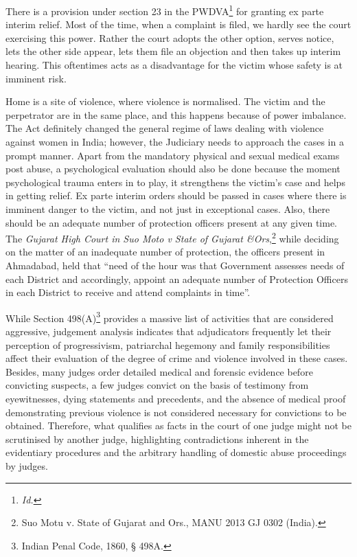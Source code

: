 \begin{multicols}{2}
\noi
There is a provision under section 23 in the PWDVA\footnote{\textit{Id.}} for granting ex parte interim relief.
Most of the time, when a complaint is filed, we hardly see the court exercising this power.
Rather the court adopts the other option, serves notice, lets the other side appear, lets them
file an objection and then takes up interim hearing. This oftentimes acts as a disadvantage for
the victim whose safety is at imminent risk. 

\noi
Home is a site of violence, where violence is normalised. The victim and the perpetrator are
in the same place, and this happens because of power imbalance. The Act definitely changed
the general regime of laws dealing with violence against women in India; however, the
Judiciary needs to approach the cases in a prompt manner. Apart from the mandatory
physical and sexual medical exams post abuse, a psychological evaluation should also be
done because the moment psychological trauma enters in to play, it strengthens the victim’s
case and helps in getting relief. Ex parte interim orders should be passed in cases where there
is imminent danger to the victim, and not just in exceptional cases. Also, there should be an
adequate number of protection officers present at any given time. The \textit{Gujarat High Court in
Suo Moto v State of Gujarat \&Ors},\footnote{Suo Motu v. State of Gujarat and Ors., MANU 2013 GJ 0302 (India).} while deciding on the matter of an inadequate number
of protection, the officers present in Ahmadabad, held that “need of the hour was that Government assesses needs of each District and accordingly, appoint an adequate number of
Protection Officers in each District to receive and attend complaints in time”.


\noi
While Section 498(A)\footnote{Indian Penal Code, 1860, § 498A.} provides a massive list of activities that are considered aggressive,
judgement analysis indicates that adjudicators frequently let their perception of
progressivism, patriarchal hegemony and family responsibilities affect their evaluation of the
degree of crime and violence involved in these cases. Besides, many judges order detailed
medical and forensic evidence before convicting suspects, a few judges convict on the basis
of testimony from eyewitnesses, dying statements and precedents, and the absence of medical
proof demonstrating previous violence is not considered necessary for convictions to be
obtained. Therefore, what qualifies as facts in the court of one judge might not be scrutinised
by another judge, highlighting contradictions inherent in the evidentiary procedures and the
arbitrary handling of domestic abuse proceedings by judges.


\end{multicols}

